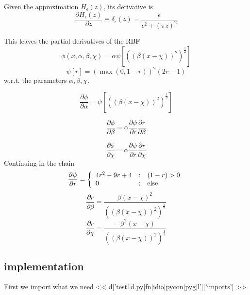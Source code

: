 \documentclass[]{article}
\begin{document}
\par
Given the approximation \(H_\epsilon(z)\), its derivative is
\begin{equation}
\frac{\partial H_\epsilon(z)}{\partial z} \equiv \delta_\epsilon(z) = 
\frac{\epsilon}{\epsilon^2 + (\pi z)^2}
\end{equation}
\par
This leaves the partial derivatives of the RBF 
\begin{equation}
\phi(x,\alpha,\beta,\chi) = \alpha \psi \left [
  ((\beta(x-\chi))^2)^{\frac{1}{2}} \right ]
\end{equation}
\begin{equation}
\psi[r] = \left ( \max{(0,1-r)} \right )^2(2r-1)
\end{equation}
w.r.t. the parameters \(\alpha, \beta, \chi\).

\begin{equation}
\frac{\partial \phi}{\partial \alpha} = \psi \left [ ((\beta(x-\chi))^2)^{\frac{1}{2}}\right ]
\end{equation}

\begin{equation}
\frac{\partial \phi}{\partial \beta} = \alpha \frac{\partial
  \psi}{\partial r} \frac{\partial r}{\partial \beta}
\end{equation}

\begin{equation}
\frac{\partial \phi}{\partial \chi} = \alpha \frac{\partial
  \psi}{\partial r} \frac{\partial r}{\partial \chi}
\end{equation}
Continuing in the chain
\begin{equation}
\frac{\partial \psi}{\partial r} = \left\{ 
\begin{array}{l@{\quad:\quad}l}
4r^2 - 9r + 4 & (1-r) > 0\\
0 & \mbox{else}
\end{array} \right.
\end{equation}
\begin{equation}
\frac{\partial r}{\partial \beta} = 
\frac{\beta(x-\chi)^2}{((\beta(x-\chi))^2)^{\frac{1}{2}}}
\end{equation}
\begin{equation}
\frac{\partial r}{\partial \chi} = 
\frac{-\beta^2(x-\chi)}{((\beta(x-\chi))^2)^{\frac{1}{2}}}
\end{equation}

\subsection{implementation}
First we import what we need
<< d['test1d.py|fn|idio|pycon|pyg|l']['imports'] >>
\end{document}
